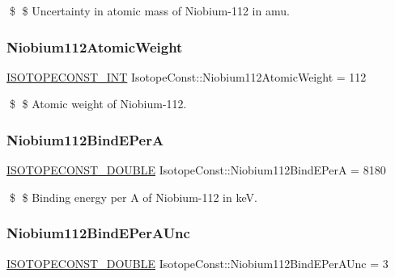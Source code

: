 \$ \$ Uncertainty in atomic mass of Niobium-\/112 in amu. \mbox{\label{group___isotope_const-_niobium-_nb112_ga45f096cd2d49c8761bc265c5d7b191a7}} 
\subsubsection{\texorpdfstring{Niobium112\+Atomic\+Weight}{Niobium112AtomicWeight}}
{\footnotesize\ttfamily \mbox{\hyperlink{group___isotope_const-_macros_ga5f18360b3e99483a35c32d789e62621c}{I\+S\+O\+T\+O\+P\+E\+C\+O\+N\+S\+T\+\_\+\+I\+NT}} Isotope\+Const\+::\+Niobium112\+Atomic\+Weight = 112}

\$ \$ Atomic weight of Niobium-\/112. \mbox{\label{group___isotope_const-_niobium-_nb112_ga43c77077afc49ff552015e445d9bc526}} 
\subsubsection{\texorpdfstring{Niobium112\+Bind\+E\+PerA}{Niobium112BindEPerA}}
{\footnotesize\ttfamily \mbox{\hyperlink{group___isotope_const-_macros_ga8f45a7272ce02c0b4c65c44636ed719a}{I\+S\+O\+T\+O\+P\+E\+C\+O\+N\+S\+T\+\_\+\+D\+O\+U\+B\+LE}} Isotope\+Const\+::\+Niobium112\+Bind\+E\+PerA = 8180}

\$ \$ Binding energy per A of Niobium-\/112 in keV. \mbox{\label{group___isotope_const-_niobium-_nb112_ga8aa90e7cef2c853a9419050750a87100}} 
\subsubsection{\texorpdfstring{Niobium112\+Bind\+E\+Per\+A\+Unc}{Niobium112BindEPerAUnc}}
{\footnotesize\ttfamily \mbox{\hyperlink{group___isotope_const-_macros_ga8f45a7272ce02c0b4c65c44636ed719a}{I\+S\+O\+T\+O\+P\+E\+C\+O\+N\+S\+T\+\_\+\+D\+O\+U\+B\+LE}} Isotope\+Const\+::\+Niobium112\+Bind\+E\+Per\+A\+Unc = 3}

